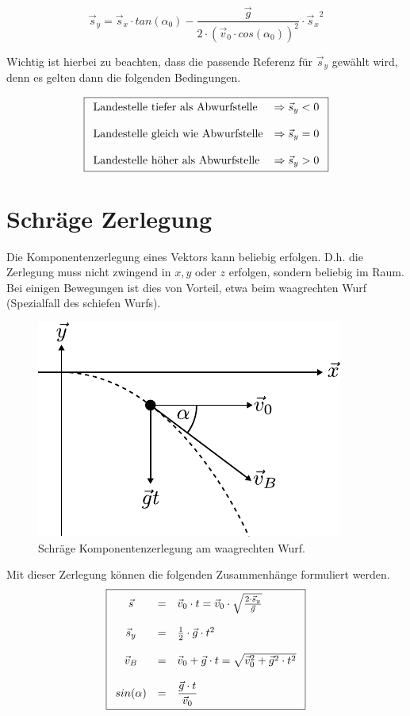 \[ \boxed{
	\vec{s}_y = \vec{s}_x \cdot tan(\alpha_0) 
		- \frac{\vec{g}}{2 \cdot \left(
		\vec{v}_0 \cdot cos(\alpha_0) \right)^2}
		\cdot {\vec{s}_x}^2
} \]

\noindent
Wichtig ist hierbei zu beachten, dass die passende Referenz für 
$\vec{s}_y$ gewählt wird, denn es gelten dann die folgenden Bedingungen.

\[ \boxed{\begin{array}{l l}
	\text{Landestelle tiefer als Abwurfstelle} 
		& \Rightarrow \vec{s}_y < 0 \\
	& \\
	\text{Landestelle gleich wie Abwurfstelle} 
		& \Rightarrow \vec{s}_y = 0 \\
	& \\
	\text{Landestelle höher als Abwurfstelle} 
		& \Rightarrow \vec{s}_y > 0 
\end{array}} \]


\section{Schräge Zerlegung}
Die Komponentenzerlegung eines Vektors kann beliebig erfolgen. 
D.h. die Zerlegung muss nicht zwingend in $x,y$ oder $z$ erfolgen,
sondern beliebig im Raum. Bei einigen Bewegungen ist dies von Vorteil,
etwa beim waagrechten Wurf (Spezialfall des schiefen Wurfs).

\begin{figure}[h!]
	\centering
	\includegraphics[scale=0.8]{wurf2.pdf}
	\caption{Schräge Komponentenzerlegung am waagrechten Wurf.}
	\label{fig:wurf2}
\end{figure}

\noindent
Mit dieser Zerlegung können die folgenden Zusammenhänge formuliert werden.
\[ \boxed{\begin{array}{c c l}
	\vec{s} 
		&=& \vec{v}_0 \cdot t
		= \vec{v}_0\cdot\sqrt{\frac{2\cdot\vec{s}_y}{\vec{g}}} \\
	& & \\
	\vec{s}_y 
		&=& \frac{1}{2} \cdot \vec{g} \cdot t^2 \\
	& & \\
	\vec{v}_B 
		&=& \vec{v}_0 + \vec{g} \cdot t
		= \sqrt{{\vec{v}_0}^2 + {\vec{g}}^2 \cdot t^2} \\
	& & \\
	sin(\alpha)
		&=& \displaystyle \frac{\vec{g}\cdot t}{\vec{v}_0}
\end{array}}\]

